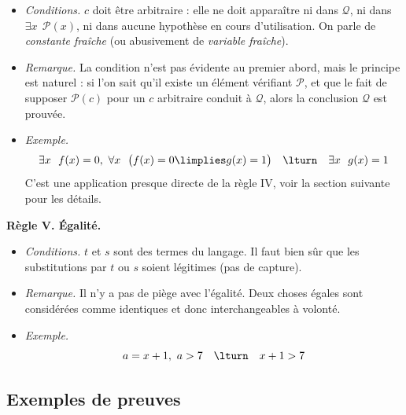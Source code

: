 \documentclass[11pt,class=report,crop=false]{standalone}
\begin{document}
	
	\medskip
	
	\begin{itemize}
	\item \emph{Conditions.} $c$ doit être arbitraire : elle ne doit apparaître ni dans $\mathcal{Q}$, ni dans $\exists x \ \ \mathcal{P}(x)$, ni dans aucune hypothèse en cours d'utilisation.
	On parle de \emph{constante fraîche} (ou abusivement de \emph{variable fraîche}).
	
	\item \emph{Remarque.} 
	La condition n'est pas évidente au premier abord, mais le principe est naturel : si l'on sait qu'il existe un élément vérifiant $\mathcal{P}$, et que le fait de supposer $\mathcal{P}(c)$ pour un $c$ arbitraire conduit à $\mathcal{Q}$, alors la conclusion $\mathcal{Q}$ est prouvée.
	
	\item \emph{Exemple.} 
	\[
	\exists x \ \ f(x)=0, \ \forall x \ \ \big( f(x) = 0 \limplies g(x) = 1 \big) \quad \lturn \quad  \exists x \ \ g(x) = 1
	\]
	C'est une application presque directe de la règle IV, voir la section suivante pour les détails.
\end{itemize}	


\bigskip

\textbf{Règle V. Égalité.} 
	
	\begin{itemize}
		\item \emph{Conditions.} $t$ et $s$ sont des termes du langage. Il faut bien sûr que les substitutions par $t$ ou $s$ soient légitimes (pas de capture).
		
		\item \emph{Remarque.} Il n'y a pas de piège avec l'égalité. Deux choses égales sont considérées comme identiques et donc interchangeables à volonté.
		
		\item \emph{Exemple.}
		\[
		a=x+1, \ a > 7 \quad \lturn \quad x+1 > 7 
		\]
	\end{itemize}
	
	
	
\subsection{Exemples de preuves}

\end{document}
